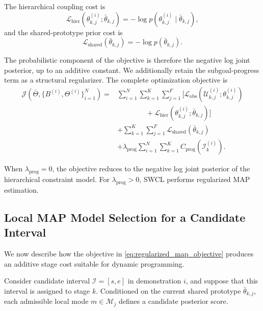 \documentclass[lettersize,journal]{IEEEtran}
\begin{document}
The hierarchical coupling cost is
\begin{equation}
\mathcal{L}_{\mathrm{hier}}
\left(
\theta_{k,j}^{(i)};
\bar{\theta}_{k,j}
\right)
=
-
\log
p
\left(
\theta_{k,j}^{(i)}
\mid
\bar{\theta}_{k,j}
\right),
\label{eq:local_hierarchical_nll}
\end{equation}
and the shared-prototype prior cost is
\begin{equation}
\mathcal{L}_{\mathrm{shared}}
\left(
\bar{\theta}_{k,j}
\right)
=
-
\log
p
\left(
\bar{\theta}_{k,j}
\right).
\label{eq:shared_prior_nll}
\end{equation}

The probabilistic component of the objective is therefore the negative log joint
posterior, up to an additive constant. We additionally retain the subgoal-progress
term as a structural regularizer. The complete optimization objective is
\begin{equation}
\begin{aligned}
\mathcal{J}
\left(
\bar{\Theta},
\{B^{(i)},\Theta^{(i)}\}_{i=1}^{N}
\right)
={}&
\sum_{i=1}^{N}
\sum_{k=1}^{K}
\sum_{j=1}^{F}
\Big[
\mathcal{L}_{\mathrm{obs}}
\left(
\mathcal{U}_{k,j}^{(i)};
\theta_{k,j}^{(i)}
\right)
\\
&\qquad\qquad+
\mathcal{L}_{\mathrm{hier}}
\left(
\theta_{k,j}^{(i)};
\bar{\theta}_{k,j}
\right)
\Big]
\\
&+
\sum_{k=1}^{K}
\sum_{j=1}^{F}
\mathcal{L}_{\mathrm{shared}}
\left(
\bar{\theta}_{k,j}
\right)
\\
&+
\lambda_{\mathrm{prog}}
\sum_{i=1}^{N}
\sum_{k=1}^{K}
C_{\mathrm{prog}}
\left(
\mathcal{I}_k^{(i)}
\right).
\end{aligned}
\label{eq:regularized_map_objective}
\end{equation}

When $\lambda_{\mathrm{prog}}=0$, the objective reduces to the negative log joint
posterior of the hierarchical constraint model. For
$\lambda_{\mathrm{prog}}>0$, SWCL performs regularized MAP estimation.


\subsection{Local MAP Model Selection for a Candidate Interval}
\label{subsec:local_map_candidate}

We now describe how the objective in
\eqref{eq:regularized_map_objective} produces an additive stage cost suitable for
dynamic programming.

Consider candidate interval $\mathcal{I}=[s,e]$ in demonstration $i$, and suppose
that this interval is assigned to stage $k$. Conditioned on the current shared
prototype $\bar{\theta}_{k,j}$, each admissible local mode
$m\in\mathcal{M}_j$ defines a candidate posterior score.
\end{document}
